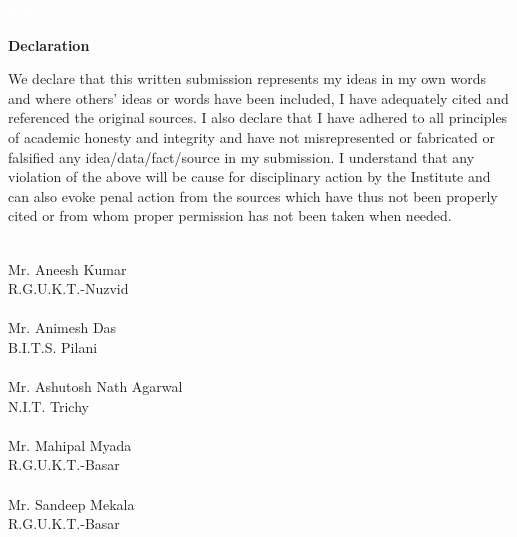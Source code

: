 \documentclass[12pt]{report}
\begin{document}
 \pagebreak \thispagestyle{empty} \textcolor{white}{text} \pagebreak
 
\LARGE
\thispagestyle{empty}

\begin{center}
\textbf{Declaration}
\end{center}
\normalsize
We declare that this written submission represents my ideas in my own words and where 
others' ideas or words have been included, I have adequately cited and referenced the original 
sources.  I also declare that I have adhered to all principles of academic honesty and integrity 
and   have   not   misrepresented   or   fabricated   or   falsified   any   idea/data/fact/source   in   my 
submission.  I understand that any violation of the above will be cause for disciplinary action 
by the Institute and can also evoke  penal action from the sources which have thus not been 
properly cited or from whom proper permission has not been taken when needed.

\vfill
\begin{flushright}

\underline{\hspace{5cm}} \\
Mr. Aneesh Kumar \\
R.G.U.K.T.-Nuzvid \\

\vfill
\underline{\hspace{5cm}} \\
Mr. Animesh Das \\
B.I.T.S. Pilani \\

\vfill
\underline{\hspace{5cm}} \\
Mr. Ashutosh Nath Agarwal \\ 
N.I.T. Trichy \\

\vfill
\underline{\hspace{5cm}} \\
Mr. Mahipal Myada \\
R.G.U.K.T.-Basar\\

\vfill
\underline{\hspace{5cm}} \\
Mr. Sandeep Mekala \\
R.G.U.K.T.-Basar\\

\vfill
\end{flushright}
\end{document}
